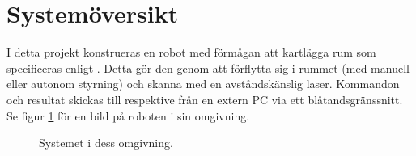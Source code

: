 \documentclass[a4paper,11pt]{article}
\begin{document}
\pagestyle{intro}
\LIPStitelsida
\clearpage
\begin{LIPSprojektidentitet}
\end{LIPSprojektidentitet}

\clearpage
\renewcommand{\familydefault}{\sfdefault}	%
\normalfont
\tableofcontents
\renewcommand{\familydefault}{\rmdefault}	%
\normalfont
\clearpage
\begin{LIPSdokumenthistorik}
\end{LIPSdokumenthistorik}
\clearpage
\setcounter{page}{1}
\pagestyle{content}

\section{Systemöversikt}
I detta projekt konstrueras en robot med förmågan att kartlägga rum som specificeras enligt \cite{coursespec}. Detta gör den genom att förflytta sig i rummet (med manuell eller autonom styrning) och skanna med en avståndskänslig laser. Kommandon och resultat skickas till respektive från en extern PC via ett blåtandsgränssnitt. Se figur \ref{fig:overview} för en bild på roboten i sin omgivning.

\begin{figure}[h!]
    \caption{Systemet i dess omgivning.}
    \label{fig:overview}
\end{figure}
\end{document}
